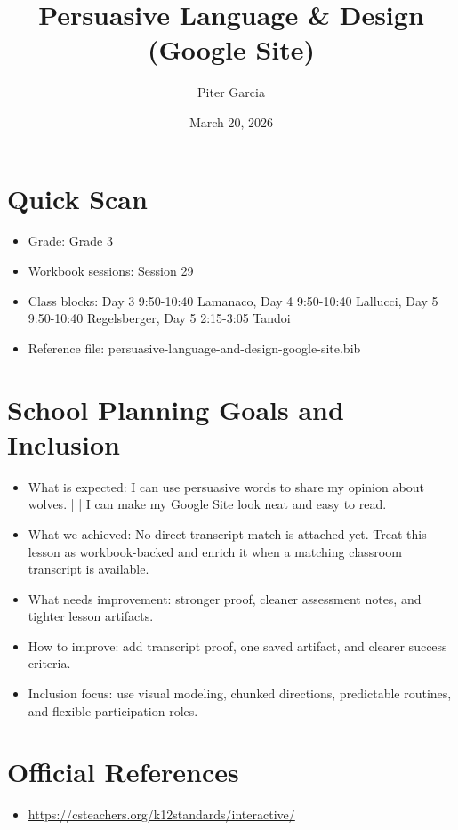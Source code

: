 \documentclass[11pt]{article}
\title{Persuasive Language & Design (Google Site)}
\author{Piter Garcia}
\date{March 20, 2026}
\begin{document}
\maketitle
\section*{Quick Scan}
\begin{itemize}[leftmargin=*]
\item Grade: Grade 3
\item Workbook sessions: Session 29
\item Class blocks: Day 3 9:50-10:40 Lamanaco, Day 4 9:50-10:40 Lallucci, Day 5 9:50-10:40 Regelsberger, Day 5 2:15-3:05 Tandoi
\item Reference file: persuasive-language-and-design-google-site.bib
\end{itemize}
\section*{School Planning Goals and Inclusion}
\begin{itemize}[leftmargin=*]
\item What is expected: I can use persuasive words to share my opinion about wolves. | | I can make my Google Site look neat and easy to read.
\item What we achieved: No direct transcript match is attached yet. Treat this lesson as workbook-backed and enrich it when a matching classroom transcript is available.
\item What needs improvement: stronger proof, cleaner assessment notes, and tighter lesson artifacts.
\item How to improve: add transcript proof, one saved artifact, and clearer success criteria.
\item Inclusion focus: use visual modeling, chunked directions, predictable routines, and flexible participation roles.
\end{itemize}
\section*{Official References}
\begin{itemize}[leftmargin=*]
\item \url{https://csteachers.org/k12standards/interactive/}

\end{itemize}
\end{document}

